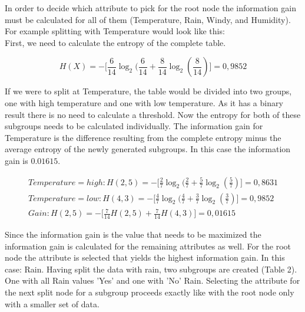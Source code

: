 \documentclass[
12pt,
headsepline,
bibliography=totoc,
twoside=semi,
fleqn
]{scrartcl}
\begin{document}
 
 In order to decide which attribute to pick for the root node the information gain must be calculated for all of them (Temperature, Rain, Windy, and Humidity). For example splitting with Temperature would look like this: \\

 First, we need to calculate the entropy of the complete table. 

\begin{equation}\label{fig:fig8}
   H(X)= - \biggl[\frac{6}{14}\log_2(\frac{6}{14}+\frac{8}{14}\log_2(\frac{8}{14})\biggr]=0,9852
\end{equation}  

 If we were to split at Temperature, the table would be divided into two groups, one with high temperature and one with low temperature. As it has a binary result there is no need to calculate a threshold. Now the entropy for both of these subgroups needs to be calculated individually. The information gain for Temperature is the difference resulting from the complete entropy minus the average entropy of the newly generated subgroups. In this case the information gain is $0.01615$. 

 \begin{equation}\label{fig:fig7}
   \begin{split}
   Temperature=high: H(2,5)= -\biggl[\frac{2}{7}\log_2(\frac{2}{7}+\frac{5}{7}\log_2(\frac{5}{7})\biggr]=0,8631
   \\
   Temperature=low: H(4,3)= -\biggl[\frac{4}{7}\log_2(\frac{4}{7}+\frac{3}{7}\log_2(\frac{3}{7})\biggr]=0,9852
   \\
   Gain: H(2,5)= -\biggl[\frac{7}{14}H(2,5)+\frac{7}{14}H(4,3)\biggr]=0,01615
\end{split}
\end{equation}  

Since the information gain is the value that needs to be maximized the information gain is calculated for the remaining attributes as well. For the root node the attribute is selected that yields the highest information gain. In this case: Rain. 
Having split the data with rain, two subgroups are created (Table 2). One with all Rain values 'Yes' and one with 'No' Rain. Selecting the attribute for the next split node for a subgroup proceeds exactly like with the root node only with a smaller set of data.
\end{document}
